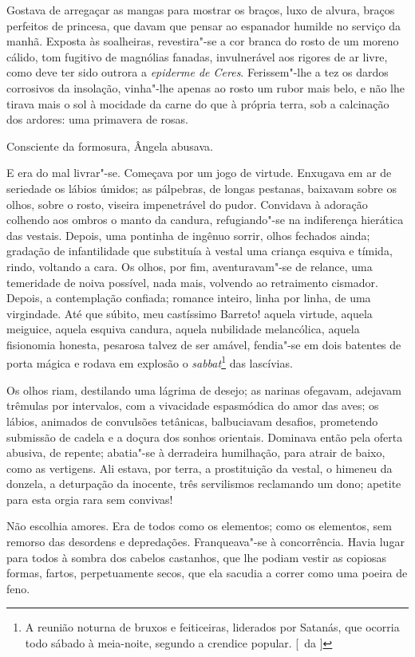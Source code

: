 Gostava de arregaçar as mangas para mostrar os braços, luxo de alvura,
braços perfeitos de princesa, que davam que pensar ao espanador humilde
no serviço da manhã. Exposta às soalheiras, revestira"-se a cor branca do
rosto de um moreno cálido, tom fugitivo de magnólias fanadas,
invulnerável aos rigores de ar livre, como deve ter sido outrora a
\textit{epiderme de Ceres}. Ferissem"-lhe a tez os dardos corrosivos da
insolação, vinha"-lhe apenas ao rosto um rubor mais belo, e não lhe
tirava mais o sol à mocidade da carne do que à própria terra, sob a
calcinação dos ardores: uma primavera de rosas. 

Consciente da formosura, Ângela abusava. 

E era do mal livrar"-se. Começava por um
jogo de virtude. Enxugava em ar de seriedade os lábios úmidos; as
pálpebras, de longas pestanas, baixavam sobre os olhos, sobre o rosto,
viseira impenetrável do pudor. Convidava à adoração colhendo aos ombros
o manto da candura, refugiando"-se na indiferença hierática das vestais.
Depois, uma pontinha de ingênuo sorrir, olhos fechados ainda; gradação
de infantilidade que substituía à vestal uma criança esquiva e tímida,
rindo, voltando a cara. Os olhos, por fim, aventuravam"-se de relance,
uma temeridade de noiva possível, nada mais, volvendo ao retraimento
cismador. Depois, a contemplação confiada; romance inteiro, linha por
linha, de uma virgindade. Até que súbito, meu castíssimo Barreto!
aquela virtude, aquela meiguice, aquela esquiva candura, aquela
nubilidade melancólica, aquela fisionomia honesta, pesarosa talvez de
ser amável, fendia"-se em dois batentes de porta mágica e rodava em
explosão o \textit{sabbat}\footnote{ A reunião noturna de bruxos e 
feiticeiras, liderados por Satanás, que ocorria todo sábado à meia-noite, 
segundo a crendice popular. [~da ]} das lascívias. 

Os olhos riam, destilando uma lágrima
de desejo; as narinas ofegavam, adejavam trêmulas por intervalos, com a
vivacidade espasmódica do amor das aves; os lábios, animados de
convulsões tetânicas, balbuciavam desafios, prometendo submissão de
cadela e a doçura dos sonhos orientais. Dominava então pela oferta
abusiva, de repente; abatia"-se à derradeira humilhação, para atrair
de baixo, como as vertigens. Ali estava, por terra, a prostituição da
vestal, o himeneu da donzela, a deturpação da inocente, três
servilismos reclamando um dono; apetite para esta orgia rara sem
convivas! 

Não escolhia amores. Era de todos como os elementos; como os
elementos, sem remorso das desordens e depredações. Franqueava"-se à
concorrência. Havia lugar para todos à sombra dos cabelos castanhos,
que lhe podiam vestir as copiosas formas, fartos, perpetuamente secos,
que ela sacudia a correr como uma poeira de feno. 

